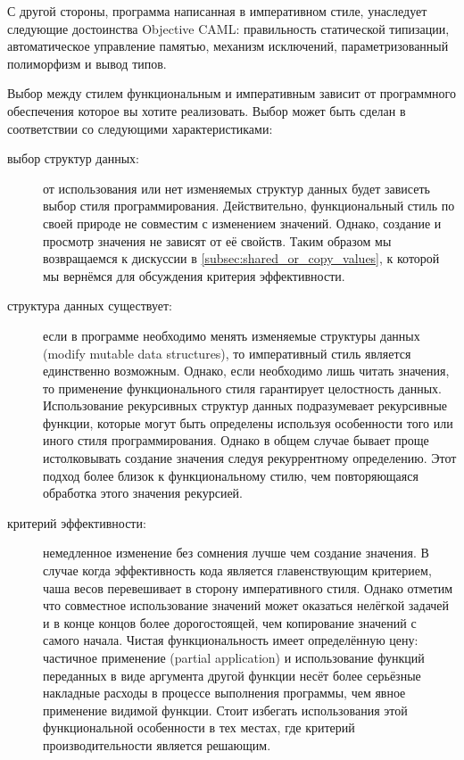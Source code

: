 С другой стороны, программа написанная в императивном стиле, унаследует
следующие достоинства Objective CAML: правильность статической типизации,
автоматическое управление памятью, механизм исключений, параметризованный
полиморфизм и вывод типов.

Выбор между стилем функциональным и императивным зависит от программного
обеспечения которое вы хотите реализовать. Выбор может быть сделан в
соответствии со следующими характеристиками:

\begin{description}
	\item [выбор структур данных:] от использования или нет изменяемых структур
данных будет зависеть выбор стиля программирования. Действительно,
функциональный стиль по своей природе не совместим с изменением значений.
Однако, создание и просмотр значения не зависят от её свойств. Таким образом мы
возвращаемся к дискуссии  в
\ref{subsec:shared_or_copy_values}, к которой мы вернёмся для обсуждения
критерия эффективности.

	\item [структура данных существует:]
    если в программе необходимо менять изменяемые структуры данных (modify
mutable data structures), то императивный стиль является единственно возможным.
Однако, если необходимо лишь читать значения, то применение функционального
стиля гарантирует целостность данных. Использование рекурсивных структур данных
подразумевает рекурсивные функции, которые могут быть определены используя
особенности того или иного стиля программирования. Однако в общем случае бывает
проще истолковывать создание значения следуя рекуррентному определению. Этот
подход более близок к функциональному стилю, чем повторяющаяся обработка этого
значения рекурсией.

	\item [критерий эффективности:] немедленное изменение без сомнения лучше чем
создание значения. В случае когда эффективность кода является главенствующим
критерием, чаша весов перевешивает в сторону императивного стиля. Однако отметим
что совместное использование значений может оказаться нелёгкой задачей и в конце
концов более дорогостоящей, чем копирование значений с самого начала. Чистая
функциональность имеет определённую цену: частичное применение (partial
application) и использование функций переданных в виде аргумента другой функции
несёт более серьёзные накладные расходы в процессе выполнения программы, чем
явное применение видимой функции. Стоит избегать использования этой
функциональной особенности в тех местах, где критерий производительности
является решающим.


\end{description}
